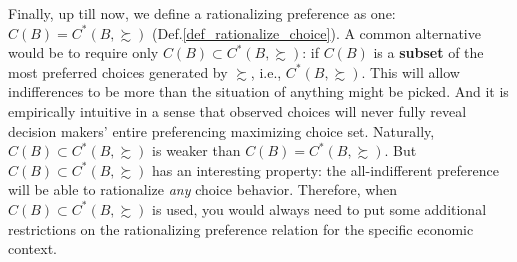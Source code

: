 Finally, up till now, we define a rationalizing preference as one: $C(B)=C^*(B,\succsim)$ (Def.\ref{def_rationalize_choice}). A common alternative would be to require only $C(B)\subset C^*(B,\succsim)$: if $C(B)$ is a \textbf{subset} of the most preferred choices generated by $\succsim$, i.e., $C^*(B,\succsim)$. This will allow indifferences
to be more than the situation of anything might be picked. And it is empirically intuitive in a sense that observed choices will never fully reveal decision makers' entire preferencing maximizing choice set. Naturally, $C(B)\subset C^*(B,\succsim)$ is weaker than $C(B)=C^*(B,\succsim)$. But $C(B)\subset C^*(B,\succsim)$ has an interesting property: the all-indifferent preference
will be able to rationalize \textit{any} choice behavior. Therefore, when $C(B)\subset C^*(B,\succsim)$ is used, you would always need to put some additional restrictions on the rationalizing preference relation for the specific economic context.